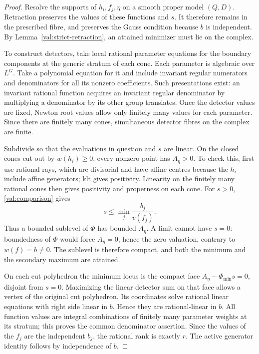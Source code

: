 \begin{proof}
Resolve the supports of $h_i,f_j,\eta$ on a smooth proper model
$(Q,D)$. Retraction preserves the values of these functions and $s$.
It therefore remains in the prescribed fibre, and preserves the
Gauss condition because $b$ is independent. By
Lemma~\ref{val:strict-retraction}, an attained minimizer must lie
on the complex.

To construct detectors, take local rational parameter equations for
the boundary components at the generic stratum of each cone. Each
parameter is algebraic over $L^G$. Take a polynomial equation for
it and include invariant regular numerators and denominators for
all its nonzero coefficients. Such presentations exist: an
invariant rational function acquires an invariant regular denominator
by multiplying a denominator by its other group translates. Once
the detector values are fixed, Newton root values allow only
finitely many values for each parameter. Since there are finitely
many cones, simultaneous detector fibres on the complex are finite.

Subdivide so that the evaluations in question and $s$ are linear.
On the closed cones cut out by $w(h_i)\ge0$, every nonzero point
has $A_\eta>0$. To check this, first use rational rays, which are
divisorial and have affine centres because the $h_i$ include affine
generators; klt gives positivity. Linearity on the finitely many
rational cones then gives positivity and properness on each cone.
For $s>0$, \eqref{val:comparison} gives
\begin{equation}\label{val:s-upper}
 s\le\min_j\frac{b_j}{v(f_j)}.
\end{equation}
Thus a bounded sublevel of $\Phi$ has bounded $A_\eta$. A limit
cannot have $s=0$: boundedness of $\Phi$ would force $A_\eta=0$,
hence the zero valuation, contrary to $w(f)=b\ne0$.
The sublevel is therefore compact, and both the minimum and the
secondary maximum are attained.

On each cut polyhedron the minimum locus is the compact face
$A_\eta-\Phi_{\min}s=0$, disjoint from $s=0$. Maximizing the linear
detector sum on that face allows a vertex of the original cut
polyhedron. Its coordinates solve rational linear equations with
right side linear in $b$. Hence they are rational-linear in $b$.
All function values are integral combinations of finitely many
parameter weights at its stratum; this proves the common
denominator assertion. Since the values of the $f_j$ are the
independent $b_j$, the rational rank is exactly $r$. The active
generator identity follows by independence of $b$.


\end{proof}
